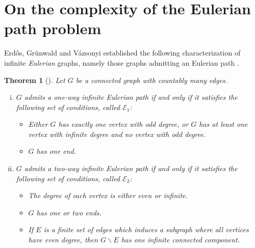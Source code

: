 \documentclass[10pt,A4]{amsart}
\newtheorem{thm}{Theorem}[section]
\theoremstyle{definition}
\theoremstyle{definition}
\newcommand{\eulerone}{\mathscr{E} _{1}}
\newcommand{\eulertwo}{\mathscr{E} _{2}}
\begin{document}
\section{On the complexity of the Eulerian path problem}\label{sec:complexity-of-Eulerianity}

Erd\H{o}s, Gr\"{u}nwald and V\'{a}zsonyi established the following characterization of infinite \emph{Eulerian} graphs, namely those graphs admitting an Eulerian path \cite{Erdos-et-al}.

\begin{thm}[\cite{Erdos-et-al}] \label{egw}
Let $G$ be a connected graph with countably many edges. 
\begin{enumerate}[(i)]
    \item $G$ admits a one-way infinite Eulerian path if and only if it satisfies the following set of conditions, called $\eulerone$:
    \begin{itemize}
        \item Either $G$ has exactly one vertex with odd degree, or $G$ has at least one vertex with infinite degree and no vertex with odd degree.   
        \item $G$ has one end.
    \end{itemize}
    \item $G$ admits a two-way infinite Eulerian path if and only if it satisfies the following set of conditions, called $\eulertwo$:
    \begin{itemize}
        \item The degree of each vertex is either even or infinite.
        \item $G$ has one or two ends. 
        \item If $E$ is a finite set of edges
        which induces a subgraph where all vertices have even degree, then
        $G\smallsetminus E$ has one infinite connected component.
    \end{itemize}
\end{enumerate}
\end{thm}
\end{document}
